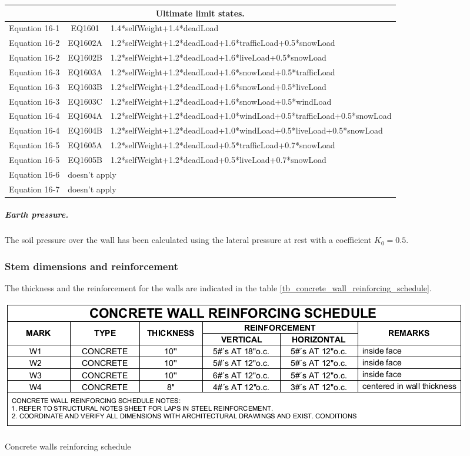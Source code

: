 \begin{center}
  \begin{footnotesize}
  \begin{tabular}{|l|c|l|}
\hline
\multicolumn{3}{|c|}{\textbf{Ultimate limit states.}}\\
\hline
Equation 16-1 & EQ1601 & 1.4*selfWeight+1.4*deadLoad\\
Equation 16-2 & EQ1602A & 1.2*selfWeight+1.2*deadLoad+1.6*trafficLoad+0.5*snowLoad\\
Equation 16-2 & EQ1602B & 1.2*selfWeight+1.2*deadLoad+1.6*liveLoad+0.5*snowLoad\\
Equation 16-3 & EQ1603A & 1.2*selfWeight+1.2*deadLoad+1.6*snowLoad+0.5*trafficLoad\\
Equation 16-3 & EQ1603B & 1.2*selfWeight+1.2*deadLoad+1.6*snowLoad+0.5*liveLoad\\
Equation 16-3 & EQ1603C & 1.2*selfWeight+1.2*deadLoad+1.6*snowLoad+0.5*windLoad\\
Equation 16-4 & EQ1604A & 1.2*selfWeight+1.2*deadLoad+1.0*windLoad+0.5*trafficLoad+0.5*snowLoad\\
Equation 16-4 & EQ1604B & 1.2*selfWeight+1.2*deadLoad+1.0*windLoad+0.5*liveLoad+0.5*snowLoad\\
Equation 16-5 & EQ1605A & 1.2*selfWeight+1.2*deadLoad+0.5*trafficLoad+0.7*snowLoad\\
Equation 16-5 & EQ1605B & 1.2*selfWeight+1.2*deadLoad+0.5*liveLoad+0.7*snowLoad\\
Equation 16-6 & \multicolumn{2}{l|}{doesn't apply}\\
Equation 16-7 & \multicolumn{2}{l|}{doesn't apply}\\
\hline
  \end{tabular}
  \end{footnotesize}
  \end{center}


\subparagraph{Earth pressure.}
The soil pressure over the wall has been calculated using the lateral pressure at rest with a coefficient $K_0= 0.5$.

\subsubsection{Stem dimensions and reinforcement}
The thickness and the reinforcement for the walls are indicated in the table \ref{tb_concrete_wall_reinforcing_schedule}.

\begin{table}
    \includegraphics[width=\linewidth]{figures/concrete_wall_reinforcing_schedule.png}
    \caption{Concrete walls reinforcing schedule}\label{tb_concrete_wall_reinforcing_schedule}
\end{table}

